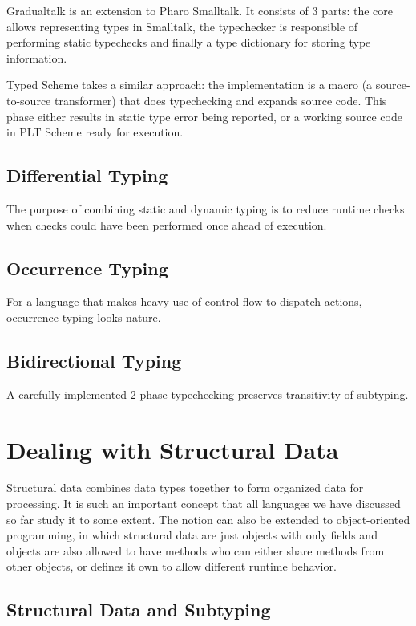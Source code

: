 Gradualtalk is an extension to Pharo Smalltalk. It consists of 3 parts:
the core allows representing types in Smalltalk, the typechecker
is responsible of performing static typechecks and finally
a type dictionary for storing type information.

Typed Scheme takes a similar approach: the implementation is a macro
(a source-to-source transformer) that does typechecking and expands source code.
This phase either results in static type error being reported,
or a working source code in PLT Scheme ready for execution.

\subsection{Differential Typing}

The purpose of combining static and dynamic typing is to reduce
runtime checks when checks could have been performed once ahead of execution.

\subsection{Occurrence Typing}

For a language that makes heavy use of control flow to dispatch actions,
occurrence typing looks nature.

\subsection{Bidirectional Typing}

A carefully implemented 2-phase typechecking preserves transitivity of subtyping.

\section{Dealing with Structural Data}

Structural data combines data types together to form organized data for processing.
It is such an important concept that all languages we have discussed so far study
it to some extent. The notion can also be extended to object-oriented programming,
in which structural data are just objects with only fields and objects are also
allowed to have methods who can either share methods from other objects,
or defines it own to allow different runtime behavior.

\subsection{Structural Data and Subtyping}

